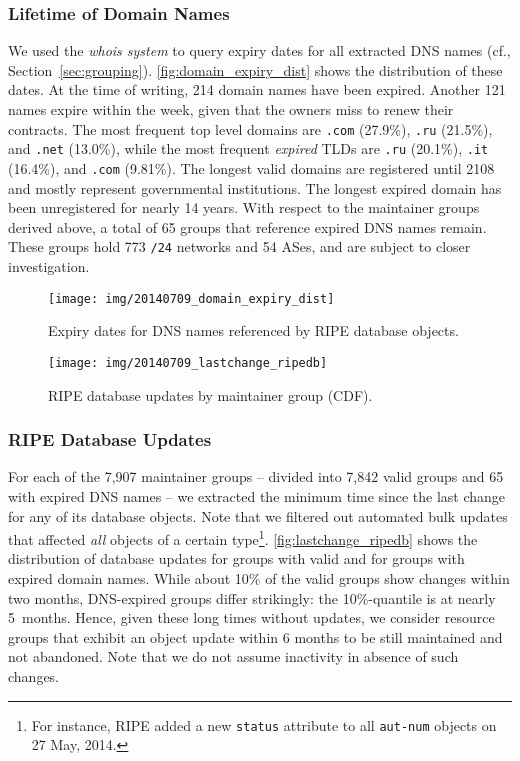 \documentclass{llncs}
\let\orgautoref\autoref
\renewcommand{\autoref}
{\def\sectionautorefname{Section}\orgautoref}
\begin{document}
\subsubsection{Lifetime of Domain Names}
We used the \textit{whois system} to query expiry dates for all extracted DNS names (cf., Section~\ref{sec:grouping}). \autoref{fig:domain_expiry_dist} shows the distribution of these dates. At the time of writing, 214 domain names have been expired. Another 121 names expire within the week, given that the owners miss to renew their contracts. The most frequent top level domains are \texttt{.com} (27.9\%), \texttt{.ru} (21.5\%), and \texttt{.net} (13.0\%), while the most frequent \textit{expired} TLDs are \texttt{.ru} (20.1\%), \texttt{.it} (16.4\%), and \texttt{.com} (9.81\%). The longest valid domains are registered until 2108 and mostly represent governmental institutions. The longest expired domain has been unregistered for nearly 14 years. With respect to the maintainer groups derived above, a total of 65 groups that reference expired DNS names remain. These groups hold 773 \texttt{/24} networks and 54 ASes, and are subject to closer investigation.


\begin{figure}[!t] \centering
\texttt{[image: img/20140709\_domain\_expiry\_dist]}
\vspace{-10pt}
\caption{Expiry dates for DNS names referenced by RIPE database objects.}
\label{fig:domain_expiry_dist}
\end{figure}

\begin{figure}[!t] \centering
\texttt{[image: img/20140709\_lastchange\_ripedb]}
\vspace{-10pt}
\caption{RIPE database updates by maintainer group (CDF).}
\label{fig:lastchange_ripedb}
\end{figure}


\subsubsection{RIPE Database Updates}
For each of the 7,907 maintainer groups -- divided into 7,842 valid groups and 65 with expired DNS names -- we extracted the minimum time since the last change for any of its database objects. Note that we filtered out automated bulk updates that affected \textit{all} objects of a certain type\footnote{For instance, RIPE added a new \texttt{status} attribute to all \texttt{aut-num} objects on 27 May, 2014.}. \autoref{fig:lastchange_ripedb} shows the distribution of database updates for groups with valid and for groups with expired domain names. While about 10\% of the valid groups show changes within two months, DNS-expired groups differ strikingly: the 10\%-quantile is at nearly 5~months. Hence, given these long times without updates, we consider resource groups that exhibit an object update within 6 months to be still maintained and not abandoned. Note that we do not assume inactivity in absence of such changes.
\end{document}
